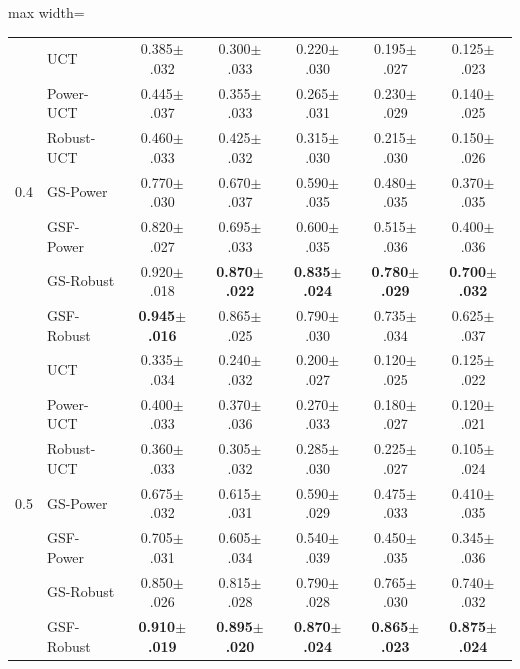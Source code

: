 \begin{table}[t]
\begin{adjustbox}{max width=\linewidth}
\begin{tabular}{llccccc}
\midrule
\multirow{7}{*}{0.4} & UCT & 0.385{\scriptsize$\pm$.032} & 0.300{\scriptsize$\pm$.033} & 0.220{\scriptsize$\pm$.030} & 0.195{\scriptsize$\pm$.027} & 0.125{\scriptsize$\pm$.023} \\
 & Power-UCT & 0.445{\scriptsize$\pm$.037} & 0.355{\scriptsize$\pm$.033} & 0.265{\scriptsize$\pm$.031} & 0.230{\scriptsize$\pm$.029} & 0.140{\scriptsize$\pm$.025} \\
 & Robust-UCT & 0.460{\scriptsize$\pm$.033} & 0.425{\scriptsize$\pm$.032} & 0.315{\scriptsize$\pm$.030} & 0.215{\scriptsize$\pm$.030} & 0.150{\scriptsize$\pm$.026} \\
 & GS-Power & 0.770{\scriptsize$\pm$.030} & 0.670{\scriptsize$\pm$.037} & 0.590{\scriptsize$\pm$.035} & 0.480{\scriptsize$\pm$.035} & 0.370{\scriptsize$\pm$.035} \\
 & GSF-Power & 0.820{\scriptsize$\pm$.027} & 0.695{\scriptsize$\pm$.033} & 0.600{\scriptsize$\pm$.035} & 0.515{\scriptsize$\pm$.036} & 0.400{\scriptsize$\pm$.036} \\
 & GS-Robust & 0.920{\scriptsize$\pm$.018} & \textbf{0.870{\scriptsize$\pm$.022}} & \textbf{0.835{\scriptsize$\pm$.024}} & \textbf{0.780{\scriptsize$\pm$.029}} & \textbf{0.700{\scriptsize$\pm$.032}} \\
 & GSF-Robust & \textbf{0.945{\scriptsize$\pm$.016}} & 0.865{\scriptsize$\pm$.025} & 0.790{\scriptsize$\pm$.030} & 0.735{\scriptsize$\pm$.034} & 0.625{\scriptsize$\pm$.037} \\
\midrule
\multirow{7}{*}{0.5} & UCT & 0.335{\scriptsize$\pm$.034} & 0.240{\scriptsize$\pm$.032} & 0.200{\scriptsize$\pm$.027} & 0.120{\scriptsize$\pm$.025} & 0.125{\scriptsize$\pm$.022} \\
 & Power-UCT & 0.400{\scriptsize$\pm$.033} & 0.370{\scriptsize$\pm$.036} & 0.270{\scriptsize$\pm$.033} & 0.180{\scriptsize$\pm$.027} & 0.120{\scriptsize$\pm$.021} \\
 & Robust-UCT & 0.360{\scriptsize$\pm$.033} & 0.305{\scriptsize$\pm$.032} & 0.285{\scriptsize$\pm$.030} & 0.225{\scriptsize$\pm$.027} & 0.105{\scriptsize$\pm$.024} \\
 & GS-Power & 0.675{\scriptsize$\pm$.032} & 0.615{\scriptsize$\pm$.031} & 0.590{\scriptsize$\pm$.029} & 0.475{\scriptsize$\pm$.033} & 0.410{\scriptsize$\pm$.035} \\
 & GSF-Power & 0.705{\scriptsize$\pm$.031} & 0.605{\scriptsize$\pm$.034} & 0.540{\scriptsize$\pm$.039} & 0.450{\scriptsize$\pm$.035} & 0.345{\scriptsize$\pm$.036} \\
 & GS-Robust & 0.850{\scriptsize$\pm$.026} & 0.815{\scriptsize$\pm$.028} & 0.790{\scriptsize$\pm$.028} & 0.765{\scriptsize$\pm$.030} & 0.740{\scriptsize$\pm$.032} \\
 & GSF-Robust & \textbf{0.910{\scriptsize$\pm$.019}} & \textbf{0.895{\scriptsize$\pm$.020}} & \textbf{0.870{\scriptsize$\pm$.024}} & \textbf{0.865{\scriptsize$\pm$.023}} & \textbf{0.875{\scriptsize$\pm$.024}} \\
\bottomrule
\end{tabular}
\end{adjustbox}
\end{table}
